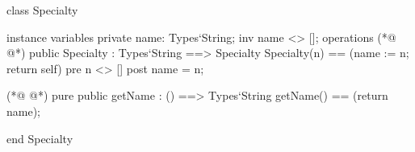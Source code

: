 \begin{vdmpp}[breaklines=true]
class Specialty

instance variables
  private name: Types`String;
  inv name <> [];
operations
(*@
\label{Specialty:7}
@*)
 public Specialty : Types`String ==> Specialty
  Specialty(n) == (name := n; return self)
 pre n <> []
 post name = n;
  
(*@
\label{getName:12}
@*)
 pure public getName : () ==> Types`String
  getName() == (return name);

end Specialty
\end{vdmpp}
